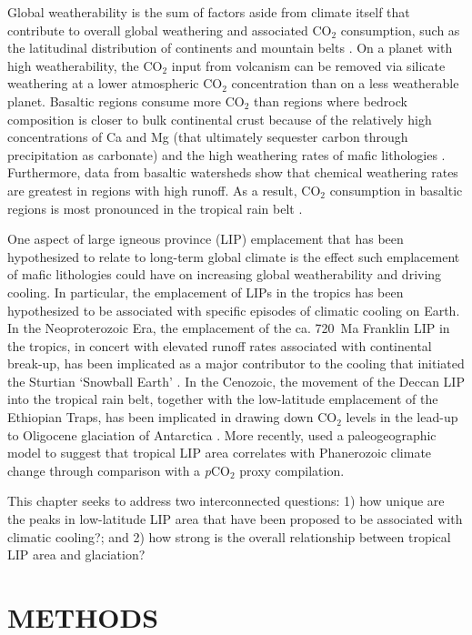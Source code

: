 \documentclass[11pt,letterpaper]{article}
\begin{document}
Global weatherability is the sum of factors aside from climate itself that contribute to overall global weathering and associated CO$_2$ consumption, such as the latitudinal distribution of continents and mountain belts \citep{Kump1997a}. On a planet with high weatherability, the CO$_2$ input from volcanism can be removed via silicate weathering at a lower atmospheric CO$_2$ concentration than on a less weatherable planet. Basaltic regions consume more CO$_2$ than regions where bedrock composition is closer to bulk continental crust because of the relatively high concentrations of Ca and Mg (that ultimately sequester carbon through precipitation as carbonate) and the high weathering rates of mafic lithologies \citep{Dessert2003a}. Furthermore, data from basaltic watersheds show that chemical weathering rates are greatest in regions with high runoff. As a result, CO$_2$ consumption in basaltic regions is most pronounced in the tropical rain belt \citep{Dessert2003a, Hartmann2009a, Hartmann2014a}.

One aspect of large igneous province (LIP) emplacement that has been hypothesized to relate to long-term global climate is the effect such emplacement of mafic lithologies could have on increasing global weatherability and driving cooling. In particular, the emplacement of LIPs in the tropics has been hypothesized to be associated with specific episodes of climatic cooling on Earth. In the Neoproterozoic Era, the emplacement of the ca. 720~Ma Franklin LIP in the tropics, in concert with elevated runoff rates associated with continental break-up, has been implicated as a major contributor to the cooling that initiated the Sturtian `Snowball Earth' \citep{Donnadieu2004b, Macdonald2010a, Cox2016a}. In the Cenozoic, the movement of the Deccan LIP into the tropical rain belt, together with the low-latitude emplacement of the Ethiopian Traps, has been implicated in drawing down CO$_2$ levels in the lead-up to Oligocene glaciation of Antarctica \citep{Kent2008a, Kent2013a}. More recently, \citet{Johansson2018a} used a paleogeographic model to suggest that tropical LIP area correlates with Phanerozoic climate change through comparison with a \textit{p}CO$_{2}$ proxy compilation.

This chapter seeks to address two interconnected questions: 1) how unique are the peaks in low-latitude LIP area that have been proposed to be associated with climatic cooling?; and 2) how strong is the overall relationship between tropical LIP area and glaciation?

\section*{METHODS}
\end{document}

